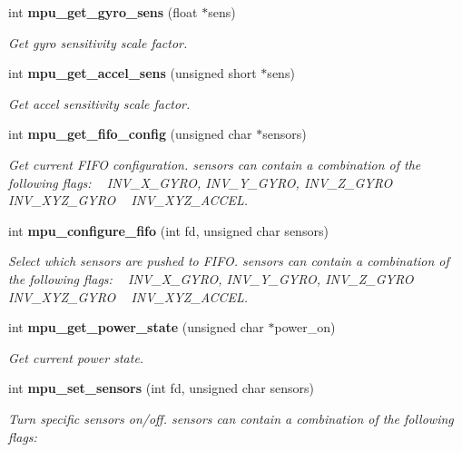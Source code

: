 \begin{DoxyCompactItemize}
int \textbf{ mpu\+\_\+get\+\_\+gyro\+\_\+sens} (float $\ast$sens)
\begin{DoxyCompactList}\small\item\em Get gyro sensitivity scale factor. \end{DoxyCompactList}\item 
int \textbf{ mpu\+\_\+get\+\_\+accel\+\_\+sens} (unsigned short $\ast$sens)
\begin{DoxyCompactList}\small\item\em Get accel sensitivity scale factor. \end{DoxyCompactList}\item 
int \textbf{ mpu\+\_\+get\+\_\+fifo\+\_\+config} (unsigned char $\ast$sensors)
\begin{DoxyCompactList}\small\item\em Get current F\+I\+FO configuration. {\itshape sensors} can contain a combination of the following flags\+: ~\newline
 I\+N\+V\+\_\+\+X\+\_\+\+G\+Y\+RO, I\+N\+V\+\_\+\+Y\+\_\+\+G\+Y\+RO, I\+N\+V\+\_\+\+Z\+\_\+\+G\+Y\+RO ~\newline
 I\+N\+V\+\_\+\+X\+Y\+Z\+\_\+\+G\+Y\+RO ~\newline
 I\+N\+V\+\_\+\+X\+Y\+Z\+\_\+\+A\+C\+C\+EL. \end{DoxyCompactList}\item 
int \textbf{ mpu\+\_\+configure\+\_\+fifo} (int fd, unsigned char sensors)
\begin{DoxyCompactList}\small\item\em Select which sensors are pushed to F\+I\+FO. {\itshape sensors} can contain a combination of the following flags\+: ~\newline
 I\+N\+V\+\_\+\+X\+\_\+\+G\+Y\+RO, I\+N\+V\+\_\+\+Y\+\_\+\+G\+Y\+RO, I\+N\+V\+\_\+\+Z\+\_\+\+G\+Y\+RO ~\newline
 I\+N\+V\+\_\+\+X\+Y\+Z\+\_\+\+G\+Y\+RO ~\newline
 I\+N\+V\+\_\+\+X\+Y\+Z\+\_\+\+A\+C\+C\+EL. \end{DoxyCompactList}\item 
int \textbf{ mpu\+\_\+get\+\_\+power\+\_\+state} (unsigned char $\ast$power\+\_\+on)
\begin{DoxyCompactList}\small\item\em Get current power state. \end{DoxyCompactList}\item 
int \textbf{ mpu\+\_\+set\+\_\+sensors} (int fd, unsigned char sensors)
\begin{DoxyCompactList}\small\item\em Turn specific sensors on/off. {\itshape sensors} can contain a combination of the following flags\+: ~\newline

\end{DoxyCompactList}
\end{DoxyCompactItemize}
